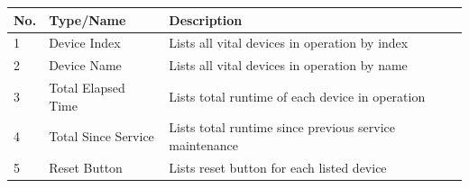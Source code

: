 \begin{longtable}[]{@{}lll@{}}
\toprule
\begin{minipage}[b]{0.07\columnwidth}\raggedright
No.\strut
\end{minipage} & \begin{minipage}[b]{0.26\columnwidth}\raggedright
Type/Name\strut
\end{minipage} & \begin{minipage}[b]{0.58\columnwidth}\raggedright
Description\strut
\end{minipage}\tabularnewline
\midrule
\endhead
\begin{minipage}[t]{0.07\columnwidth}\raggedright
1\strut
\end{minipage} & \begin{minipage}[t]{0.26\columnwidth}\raggedright
Device Index\strut
\end{minipage} & \begin{minipage}[t]{0.58\columnwidth}\raggedright
Lists all vital devices in operation by index\strut
\end{minipage}\tabularnewline
\begin{minipage}[t]{0.07\columnwidth}\raggedright
2\strut
\end{minipage} & \begin{minipage}[t]{0.26\columnwidth}\raggedright
Device Name\strut
\end{minipage} & \begin{minipage}[t]{0.58\columnwidth}\raggedright
Lists all vital devices in operation by name\strut
\end{minipage}\tabularnewline
\begin{minipage}[t]{0.07\columnwidth}\raggedright
3\strut
\end{minipage} & \begin{minipage}[t]{0.26\columnwidth}\raggedright
Total Elapsed Time\strut
\end{minipage} & \begin{minipage}[t]{0.58\columnwidth}\raggedright
Lists total runtime of each device in operation\strut
\end{minipage}\tabularnewline
\begin{minipage}[t]{0.07\columnwidth}\raggedright
4\strut
\end{minipage} & \begin{minipage}[t]{0.26\columnwidth}\raggedright
Total Since Service\strut
\end{minipage} & \begin{minipage}[t]{0.58\columnwidth}\raggedright
Lists total runtime since previous service maintenance\strut
\end{minipage}\tabularnewline
\begin{minipage}[t]{0.07\columnwidth}\raggedright
5\strut
\end{minipage} & \begin{minipage}[t]{0.26\columnwidth}\raggedright
Reset Button\strut
\end{minipage} & \begin{minipage}[t]{0.58\columnwidth}\raggedright
Lists reset button for each listed device\strut
\end{minipage}\tabularnewline
\bottomrule
\end{longtable}

